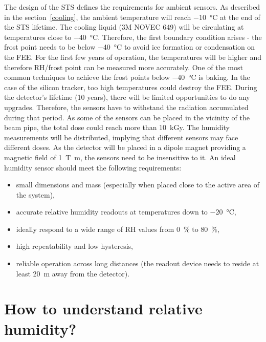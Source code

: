 The design of the \gls{STS} \cite{Heuser:54798} defines the requirements for ambient sensors. As described in the section~\ref{cooling}, the ambient temperature will reach \SI{-10}{\celsius} at the end of the \gls{STS} lifetime. The cooling liquid (3M NOVEC 649) will be circulating at temperatures close to \SI{-40}{\celsius}. Therefore, the first boundary condition arises - the frost point needs to be below \SI{-40}{\celsius} to avoid ice formation or condensation on the \gls{FEE}. For the first few years of operation, the temperatures will be higher and therefore RH/frost point can be measured more accurately. One of the most common techniques to achieve the frost points below \SI{-40}{\celsius} is baking. In the case of the silicon tracker, too high temperatures could destroy the \gls{FEE}. 
During the detector's lifetime (10 years), there will be limited opportunities to do any upgrades. Therefore, the sensors have to withstand the radiation accumulated during that period. As some of the sensors can be placed in the vicinity of the beam pipe, the total dose could reach more than 10~kGy. The humidity measurements will be distributed, implying that different sensors may face different doses. As the detector will be placed in a dipole magnet providing a magnetic field of \SI{1}{\tesla\metre}, the sensors need to be insensitive to it. An ideal humidity sensor should meet the following requirements:
\begin{itemize}
    \item small dimensions and mass (especially when placed close to the active area of the system),
    \item accurate relative humidity readouts at temperatures down to \SI{-20}{\celsius}, 
    \item ideally respond to a wide range of \gls{RH} values from 0~\% to 80~\%,
    \item high repeatability and low hysteresis,
    \item reliable operation across long distances (the readout device needs to reside at least \SI{20}{\metre} away from the detector).
\end{itemize}

\section{How to understand relative humidity?}

